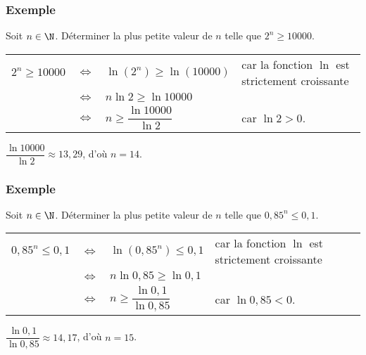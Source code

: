 \subsubsection{Exemple }

Soit $n\in \N$. Déterminer la plus petite valeur de $n$ telle que $2^n \geqslant 10 000$. \\

\begin{tabular}{llll}
$2^n \geqslant 10 000$ & $\Longleftrightarrow$ & $\ln \left(2^n\right) \geqslant \ln \left(10 000\right)$ & car la fonction $\ln$ est strictement croissante \vspace*{.3cm} \\
& $\Longleftrightarrow$ & $n\ln 2 \geqslant \ln 10 000$ & \vspace*{.3cm} \\
& $\Longleftrightarrow$ & $n \geqslant \dfrac{\ln 10 000}{\ln 2}$ & car $\ln 2 > 0$. \\
\end{tabular}


$\dfrac{\ln 10 000}{\ln 2} \approx 13,29$, d'où $n = 14$.

\subsubsection{Exemple }

Soit $n\in \N$. Déterminer la plus petite valeur de $n$ telle que $0,85^n \leqslant 0,1$. \\

\begin{tabular}{llll}
$0,85^n \leqslant 0,1$ & $\Longleftrightarrow$ & $\ln \left(0,85^n\right) \leqslant 0,1$ & car la fonction $\ln$ est strictement croissante \vspace*{.3cm} \\
& $\Longleftrightarrow$ & $n\ln 0,85 \geqslant \ln 0,1$ & \vspace*{.3cm} \\
& $\Longleftrightarrow$ & $n \geqslant \dfrac{\ln 0,1}{\ln 0,85}$ & car $\ln 0,85 < 0$. \\
\end{tabular}


$\dfrac{\ln 0,1}{\ln 0,85} \approx 14,17$, d'où $n = 15$. \\

